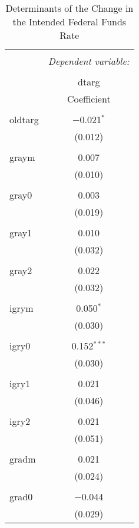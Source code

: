 
\begin{table}[!htbp] \centering 
  \caption{Determinants of the Change in the Intended Federal Funds Rate} 
  \label{} 
\begin{tabular}{@{\extracolsep{5pt}}lc} 
\\[-1.8ex]\hline 
\hline \\[-1.8ex] 
 & \multicolumn{1}{c}{\textit{Dependent variable:}} \\ 
\cline{2-2} 
\\[-1.8ex] & dtarg \\ 
 & Coefficient \\ 
\hline \\[-1.8ex] 
 oldtarg & $-$0.021$^{*}$ \\ 
  & (0.012) \\ 
  & \\ 
 graym & 0.007 \\ 
  & (0.010) \\ 
  & \\ 
 gray0 & 0.003 \\ 
  & (0.019) \\ 
  & \\ 
 gray1 & 0.010 \\ 
  & (0.032) \\ 
  & \\ 
 gray2 & 0.022 \\ 
  & (0.032) \\ 
  & \\ 
 igrym & 0.050$^{*}$ \\ 
  & (0.030) \\ 
  & \\ 
 igry0 & 0.152$^{***}$ \\ 
  & (0.030) \\ 
  & \\ 
 igry1 & 0.021 \\ 
  & (0.046) \\ 
  & \\ 
 igry2 & 0.021 \\ 
  & (0.051) \\ 
  & \\ 
 gradm & 0.021 \\ 
  & (0.024) \\ 
  & \\ 
 grad0 & $-$0.044 \\ 
  & (0.029) \\ 

\end{tabular}
\end{table}
